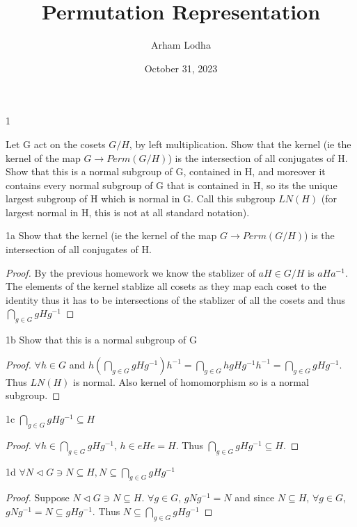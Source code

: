 \documentclass{article}
\begin{document}
\title{Permutation Representation}
\author{Arham Lodha}%
\date{October 31, 2023}%
\maketitle

\begin{PROB}{1}\label{Problem 1.}

    Let G act on the cosets $G/H$, by left multiplication.  Show that the kernel (ie the kernel of the map $G \to Perm(G/H)$) is the intersection of all conjugates of H. Show that this is a normal subgroup of G, contained in H, and moreover it contains every normal subgroup of G that is contained in H, so its the unique largest subgroup of H which is normal in G.  Call this subgroup $LN(H)$ (for largest normal in H, this is not at all standard notation).

\end{PROB}
\begin{claim}{1a}
    Show that the kernel (ie the kernel of the map $G \to Perm(G/H)$) is the intersection of all conjugates of H.
\end{claim}
\begin{proof}
    By the previous homework we know the stablizer of $aH \in G/H$ is $aHa^{-1}$. The elements of the kernel stablize all cosets as they map each coset to the identity thus it has to be intersections of the stablizer of all the cosets and thus $\bigcap_{g \in G} gHg^{-1}$
\end{proof}

\begin{claim}{1b}
    Show that this is a normal subgroup of G
\end{claim}
\begin{proof}
    $\forall h \in G$ and $h(\bigcap_{g \in G} gHg^{-1})h^{-1} = \bigcap_{g \in G} hgHg^{-1}h^{-1} = \bigcap_{g \in G} gHg^{-1}$. Thus $LN(H)$ is normal. Also kernel of homomorphism so is a normal subgroup.
\end{proof}

\begin{claim}{1c}
    $\bigcap_{g \in G} gHg^{-1} \subseteq H$
\end{claim}
\begin{proof}
    $\forall h \in \bigcap_{g \in G} gHg^{-1}$, $h \in eHe = H$. Thus $\bigcap_{g \in G} gHg^{-1} \subseteq H$.
\end{proof}

\begin{claim}{1d}
    $\forall N \triangleleft G \ni N \subseteq H, N \subseteq \bigcap_{g \in G} gHg^{-1}$
\end{claim}
\begin{proof}
    Suppose $N \triangleleft G \ni N \subseteq H$. $\forall g \in G$, $gNg^{-1} = N$ and since $N \subseteq H$, $\forall g \in G$, $gNg^{-1} = N \subseteq gHg^{-1}$. Thus $N \subseteq \bigcap_{g \in G} gHg^{-1}$
\end{proof}
\end{document}
